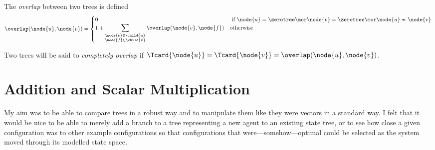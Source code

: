 \begin{definition}
  The \emph{overlap} between two trees is defined
  \[
  \overlap(\node{u},\node{v}) = \begin{cases}
    0 & \text{ if } \node{u} = \zerotree \mor \node{v} = \zerotree \mor \node{u}\nsim\node{v} \\
    1 + \displaystyle\sum_{\substack{\node{e}\in\child{u} \\ \node{f}\in\child{v}}} \overlap(\node{e},\node{f}) & \text{otherwise}
  \end{cases}
  \]

  Two trees will be said to \emph{completely overlap} if
  $\Tcard{\node{u}} = \Tcard{\node{v}} = \overlap(\node{u},\node{v})$.
\end{definition}





\section{Addition and Scalar Multiplication}

My aim was to be able to compare trees in a robust way and to
manipulate them like they were vectors in a standard way.  I felt that
it would be nice to be able to merely add a branch to a tree
representing a new agent to an existing state tree, or to see how
close a given configuration was to other example configurations so
that configurations that were---somehow---optimal could be selected as
the system moved through its modelled state space.

